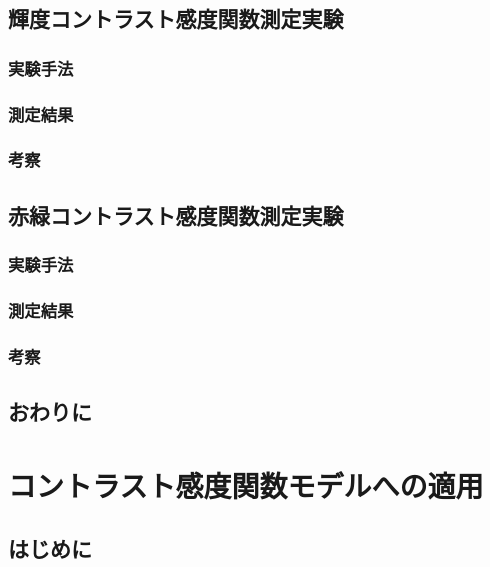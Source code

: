 \documentclass[11pt,oneside,openany,report]{jsbook}
\begin{document}
  \section{輝度コントラスト感度関数測定実験}

    \subsection{実験手法}

    \subsection{測定結果}

    \subsection{考察}

  \section{赤緑コントラスト感度関数測定実験}

    \subsection{実験手法}

    \subsection{測定結果}

    \subsection{考察}

  \section{おわりに}


\chapter{コントラスト感度関数モデルへの適用}

  \section{はじめに}
\end{document}
